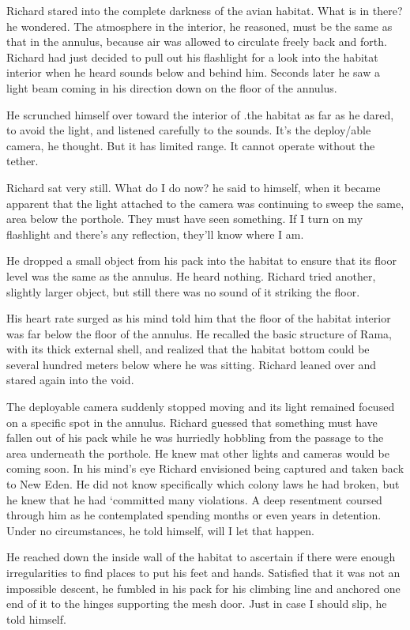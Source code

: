 \documentclass[]{article}
\begin{document}
{Richard stared into the complete darkness of the avian habitat.  What is in there? he wondered.  The atmosphere in the interior, he reasoned, must be the same as that in the annulus, because air was allowed to circulate freely back and forth.  Richard had just decided to pull out his flashlight for a look into the habitat interior when he heard sounds below and behind him.  Seconds later he saw a light beam coming in his direction down on the floor of the annulus.

He scrunched himself over toward the interior of .the habitat as far as he dared, to avoid the light, and listened carefully to the sounds.  It’s the deploy/able camera, he thought.  But it has limited range.  It cannot operate without the tether.

Richard sat very still.  What do I do now? he said to himself, when it became apparent that the light attached to the camera was continuing to sweep the same, area below the porthole.  They must have seen something.  If I turn on my flashlight and there’s any reflection, they’ll know where I am.

He dropped a small object from his pack into the habitat to ensure that its floor level was the same as the annulus.  He heard nothing.  Richard tried another, slightly larger object, but still there was no sound of it striking the floor.

His heart rate surged as his mind told him that the floor of the habitat interior was far below the floor of the annulus.  He recalled the basic structure of Rama, with its thick external shell, and realized that the habitat bottom could be several hundred meters below where he was sitting.  Richard leaned over and stared again into the void.

The deployable camera suddenly stopped moving and its light remained focused on a specific spot in the annulus.  Richard guessed that something must have fallen out of his pack while he was hurriedly hobbling from the passage to the area underneath the porthole.  He knew mat other lights and cameras would be coming soon.  In his mind’s eye Richard envisioned being captured and taken back to New Eden.  He did not know specifically which colony laws he had broken, but he knew that he had ‘committed many violations.  A deep resentment coursed through him as he contemplated spending months or even years in detention.  Under no circumstances, he told himself, will I let that happen.

He reached down the inside wall of the habitat to ascertain if there were enough irregularities to find places to put his feet and hands.  Satisfied that it was not an impossible descent, he fumbled in his pack for his climbing line and anchored one end of it to the hinges supporting the mesh door.  Just in case I should slip, he told himself.

}
\end{document}
